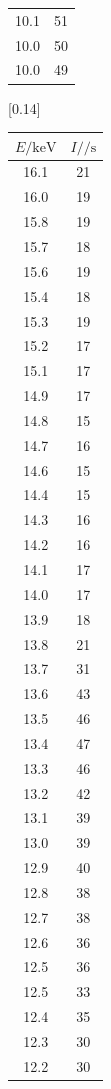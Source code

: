 \begin{table}[h! p]
{\begin{tabular}{c c|}
    10.1 & 51 \\
    10.0 & 50 \\
    10.0 & 49 \\
    \bottomrule
  \end{tabular}
  }\qquad \hfill
  [0.14\textwidth]{
  \begin{tabular}{|c c|}
    \toprule
    $E / \si{\kilo\electronvolt}$ & $I / \si{\per\second}$ \\
    \midrule
    16.1 & 21 \\
    16.0 & 19 \\
    15.8 & 19 \\
    15.7 & 18 \\
    15.6 & 19 \\
    15.4 & 18 \\
    15.3 & 19 \\
    15.2 & 17 \\
    15.1 & 17 \\
    14.9 & 17 \\
    14.8 & 15 \\
    14.7 & 16 \\
    14.6 & 15 \\
    14.4 & 15 \\
    14.3 & 16 \\
    14.2 & 16 \\
    14.1 & 17 \\
    14.0 & 17 \\
    13.9 & 18 \\
    13.8 & 21 \\
    13.7 & 31 \\
    13.6 & 43 \\
    13.5 & 46 \\
    13.4 & 47 \\
    13.3 & 46 \\
    13.2 & 42 \\
    13.1 & 39 \\
    13.0 & 39 \\
    12.9 & 40 \\
    12.8 & 38 \\
    12.7 & 38 \\
    12.6 & 36 \\
    12.5 & 36 \\
    12.5 & 33 \\
    12.4 & 35 \\
    12.3 & 30 \\
    12.2 & 30 \\

\end{tabular}}
\end{table}
